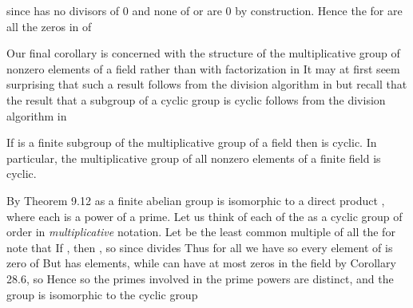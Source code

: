 \documentclass[11pt,oneside]{article}
\begin{document}
\begin{BookBody}
\noindent since  has no divisors of 0 and none of  or  are 0 by construction. Hence the  for  are all the zeros in  of \BookEnd{\blacklozenge}

Our final corollary is concerned with the structure of the multiplicative group  of nonzero elements of a field  rather than with factorization in  It may at first seem surprising that such a result follows from the division algorithm in  but recall that the result that a subgroup of a cyclic group is cyclic follows from the division algorithm in 

 If  is a finite subgroup of the multiplicative group  of a field  then  is cyclic. In particular, the multiplicative group of all nonzero elements of a finite field is cyclic.

 By Theorem 9.12 as a finite abelian group is isomorphic to a direct product  , where each  is a power of a prime. Let us think of each of the  as a cyclic group of order  in\textit{ multiplicative} notation. Let  be the least common multiple of all the  for  note that  If , then , so  since  divides  Thus for all  we have  so every element of  is zero of  But  has  elements, while  can have at most  zeros in the field  by Corollary 28.6, so  Hence  so the primes involved in the prime powers  are distinct, and the group  is isomorphic to the cyclic group \BookEnd{\blacklozenge}


\end{BookBody}
\end{document}
